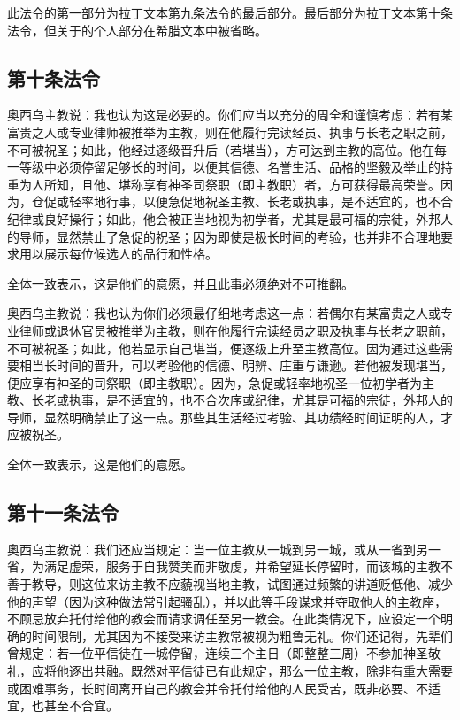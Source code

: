 此法令的第一部分为拉丁文本第九条法令的最后部分。最后部分为拉丁文本第十条法令，但关于的个人部分在希腊文本中被省略。\par


\subsection{第十条法令}

奥西乌主教说：我也认为这是必要的。你们应当以充分的周全和谨慎考虑：若有某富贵之人或专业律师被推举为主教，则在他履行完读经员、执事与长老之职之前，不可被祝圣；如此，他经过逐级晋升后（若堪当），方可达到主教的高位。他在每一等级中必须停留足够长的时间，以便其信德、名誉生活、品格的坚毅及举止的持重为人所知，且他、堪称享有神圣司祭职（即主教职）者，方可获得最高荣誉。因为，仓促或轻率地行事，以便急促地祝圣主教、长老或执事，是不适宜的，也不合纪律或良好操行；如此，他会被正当地视为初学者，尤其是最可福的宗徒，外邦人的导师，显然禁止了急促的祝圣；因为即使是极长时间的考验，也并非不合理地要求用以展示每位候选人的品行和性格。\par

全体一致表示，这是他们的意愿，并且此事必须绝对不可推翻。\par

奥西乌主教说：我也认为你们必须最仔细地考虑这一点：若偶尔有某富贵之人或专业律师或退休官员被推举为主教，则在他履行完读经员之职及执事与长老之职前，不可被祝圣；如此，他若显示自己堪当，便逐级上升至主教高位。因为通过这些需要相当长时间的晋升，可以考验他的信德、明辨、庄重与谦逊。若他被发现堪当，便应享有神圣的司祭职（即主教职）。因为，急促或轻率地祝圣一位初学者为主教、长老或执事，是不适宜的，也不合次序或纪律，尤其是可福的宗徒，外邦人的导师，显然明确禁止了这一点。那些其生活经过考验、其功绩经时间证明的人，才应被祝圣。\par

全体一致表示，这是他们的意愿。\par


\subsection{第十一条法令}

奥西乌主教说：我们还应当规定：当一位主教从一城到另一城，或从一省到另一省，为满足虚荣，服务于自我赞美而非敬虔，并希望延长停留时，而该城的主教不善于教导，则这位来访主教不应藐视当地主教，试图通过频繁的讲道贬低他、减少他的声望（因为这种做法常引起骚乱），并以此等手段谋求并夺取他人的主教座，不顾忌放弃托付给他的教会而请求调任至另一教会。在此类情况下，应设定一个明确的时间限制，尤其因为不接受来访主教常被视为粗鲁无礼。你们还记得，先辈们曾规定：若一位平信徒在一城停留，连续三个主日（即整整三周）不参加神圣敬礼，应将他逐出共融。既然对平信徒已有此规定，那么一位主教，除非有重大需要或困难事务，长时间离开自己的教会并令托付给他的人民受苦，既非必要、不适宜，也甚至不合宜。\par

